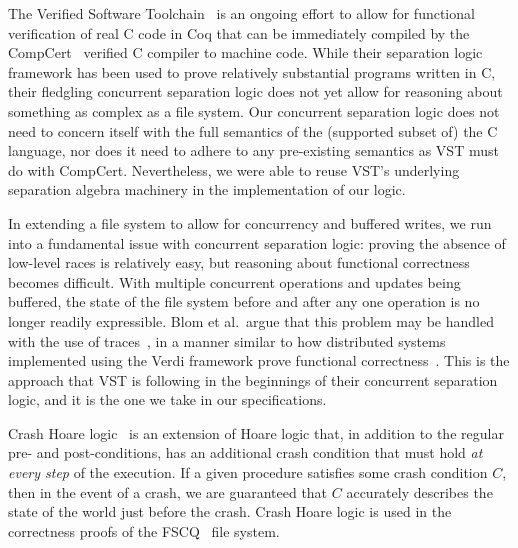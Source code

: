 The Verified Software Toolchain~\cite{appel2014program} is an ongoing effort to
allow for functional verification of real C code in Coq that can be immediately
compiled by the CompCert~\cite{leroy2009formal} verified C compiler to machine
code.
While their separation logic framework has been used to prove relatively
substantial programs written in C, their fledgling concurrent separation logic
does not yet allow for reasoning about something as complex as a file system.
Our concurrent separation logic does not need to concern itself with the full
semantics of the (supported subset of) the C language, nor does it need to
adhere to any pre-existing semantics as VST must do with CompCert.
Nevertheless,
we were able to reuse VST's underlying
separation algebra machinery in
the implementation of our logic.

In extending a file system to allow for concurrency and buffered writes, we run
into a fundamental issue with concurrent separation logic: proving the
absence of low-level races is relatively easy,
but reasoning about functional correctness becomes difficult.
With multiple concurrent operations and
updates being buffered, the state of the file system before and after
any one operation is no longer readily expressible.
Blom et al.\ argue that
this problem may be handled with the use of traces~\cite{blom2015history}, in a
manner similar to how distributed systems implemented using the Verdi framework
prove functional correctness~\cite{wilcox2015verdi}.
This is the approach that
VST is following in the beginnings of their concurrent separation logic, and it
is the one we take in our specifications.


Crash Hoare logic~\cite{chen2015using} is an extension of Hoare logic that, in
addition to the regular pre- and post-conditions, has an additional crash
condition that must hold \textit{at every step} of the execution.
If a given
procedure satisfies some crash condition $C$, then in the event of a crash, we
are guaranteed that $C$ accurately describes the state of the world just before
the crash.
Crash Hoare logic is used in the correctness proofs of the
FSCQ~\cite{chen2015using} file system.

